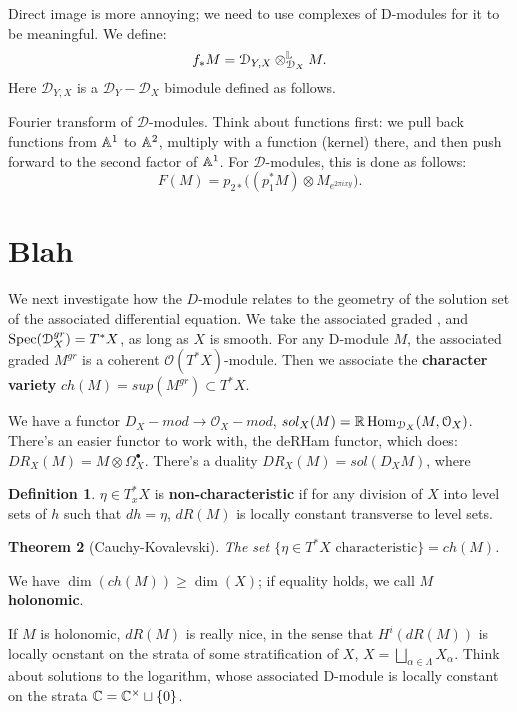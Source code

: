\documentclass[10pt,a4paper,reqno,oneside]{book} %
\theoremstyle{plain}
\newtheorem{thm}{Theorem}[section]
\theoremstyle{definition}
\newtheorem{defin}[thm]{Definition}
\theoremstyle{remark}
\numberwithin{equation}{section}
\begin{document}
Direct image is more annoying; we need to use complexes of D-modules for it to be meaningful. We define:
\[	f_* M = \mathcal{D}_{Y , X} \otimes^{\mathbb L}_{\mathcal{D}_X} M.	\]
Here $\mathcal{D}_{Y , X}$ is a $\mathcal{D}_Y - \mathcal{D}_X$ bimodule defined as follows. 


Fourier transform of $\mathcal{D}$-modules. Think about functions first: we pull back functions from $\mathbb A^1$ to
$\mathbb A^2$, multiply with a function (kernel) there, and then push forward to the second factor of $\mathbb A^1$.
For $\mathcal{D}$-modules, this is done as follows:
\[	F(M) = p_{2*} \big( (p_1^* M) \otimes M_{e^{2\pi i xy}} \big) . \]


\section{Blah}
We next investigate how the $D$-module relates to the geometry of the solution set of the associated differential equation.
We take the associated graded , and $\operatorname{Spec} (\mathcal{D}_X^{gr}) = T^*X$, as long as $X$ is
smooth. For any D-module $M$, the associated graded $M^{gr}$ is a coherent $\mathcal{O}(T^*X)$-module. Then we associate
the \textbf{character variety} $ch(M) =  sup(M^{gr}) \subset T^*X$.

We have a functor $D_X -mod \to \mathcal{O}_X -mod$, $sol_X (M) = \mathbb R \operatorname{Hom}_{\mathcal{D}_X}(M,\mathcal{O}_X)$.
There's an easier functor to work with, the deRHam functor, which does: $DR_X(M) = M \otimes \Omega_X^{\bullet}$.
There's a duality $DR_X(M) = sol(D_X M)$, where 

\begin{defin}
$\eta \in T^*_x X$ is \textbf{non-characteristic} if for any division of $X$ into level sets of $h$ such that $dh = \eta$,
$dR(M)$ is locally constant transverse to level sets.
\end{defin}

\begin{thm}[Cauchy-Kovalevski]
The set $\{\eta \in T^*X \text{ characteristic}\} = ch(M)$.
\end{thm}

We have $\dim(ch(M)) \geq \dim(X)$; if equality holds, we call $M$ \textbf{holonomic}.

If $M$ is holonomic, $dR(M)$ is really nice, in the sense that $H^i(dR(M))$ is locally ocnstant on the strata of some 
stratification of $X$, $X = \bigsqcup_{\alpha \in \Lambda} X_{\alpha}$. Think about solutions to the logarithm,
whose associated D-module is locally constant on the strata $\mathbb C = \mathbb C^{\times} \sqcup \{0\}$.
\end{document}
